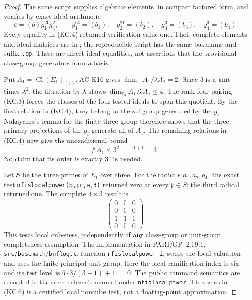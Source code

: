 \begin{proof}
The same script supplies algebraic elements, in compact
factored form, and verifies by exact ideal arithmetic
\[
 \mathfrak q=(b)g_1^{21}g_4^2,
 \qquad
 g_1^{63}=(b_1),\quad g_2^{21}=(b_2),\quad
             g_3^3=(b_3),\quad g_4^3=(b_4).            \tag{KC.4}
\]
Every equality in (KC.4) returned verification value one.
Their complete elements and ideal matrices are in
; the reproducible
script has the same basename and suffix \texttt{.gp}.
These are direct ideal equalities, not assertions that the
provisional class-group generators form a basis.

Put $A_1=\operatorname{Cl}(E_1)_{(3)}$.
AC-K16 gives $\dim_{\mathbb F_3}A_1/\lambda A_1=2$.
Since $3$ is a unit times $\lambda^2$, the filtration by
$\lambda$ shows $\dim_{\mathbb F_3}A_1/3A_1\leq4$.
The rank-four pairing (KC.3) forces the classes of the four
tested ideals to span this quotient.  By the first relation
in (KC.4), they belong to the subgroup generated by the
$g_i$.  Nakayama's lemma for the finite three-group therefore
shows that the three-primary projections of the $g_i$
generate all of $A_1$.  The remaining relations in (KC.4)
now give the unconditional bound
\[
                       \#A_1\leq3^{2+1+1+1}=3^5.     \tag{KC.5}
\]
No claim that its order is exactly $3^5$ is needed.

Let $S$ be the three primes of $E_1$ over three.
For the radicals $a_1,a_2,a_4$, the exact test
\texttt{nfislocalpower(b,pr,a,3)} returned zero at every
$\mathfrak p\in S$; the third radical returned one.
The complete $4\times3$ result is
\[
 \begin{pmatrix}0&0&0\\0&0&0\\1&1&1\\0&0&0\end{pmatrix}.
                                                               \tag{KC.6}
\]
This tests local cubeness, independently of any class-group
or unit-group completeness assumption.  The implementation
in PARI/GP~2.19.1, \texttt{src/basemath/bnflog.c}, function
\texttt{nfislocalpower\_i}, strips the local valuation and
uses the finite principal-unit group.  Here the local
ramification index is six and its test level is
$6\cdot3/(3-1)+1=10$.  The public command semantics are
recorded in the same release's manual under
\texttt{nfislocalpower}.  Thus zero in (KC.6) is a certified
local noncube test, not a floating-point approximation.


\end{proof}
